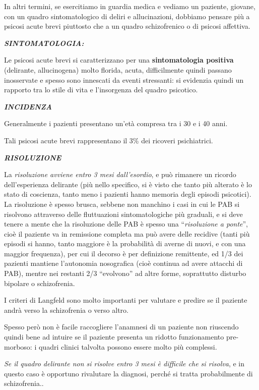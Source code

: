 \documentclass[]{article}
\begin{document}
In altri termini, se esercitiamo in guardia medica e vediamo un
paziente, giovane, con un quadro sintomatologico di deliri e
allucinazioni, dobbiamo pensare più a psicosi acute brevi piuttosto che
a un quadro schizofrenico o di psicosi affettiva.

\textbf{\emph{SINTOMATOLOGIA:}}

Le psicosi acute brevi si caratterizzano per una \textbf{sintomatologia
positiva} (delirante, allucinogena) molto florida, acuta, difficilmente
quindi passano inosservate e spesso sono innescati da eventi stressanti:
si evidenzia quindi un rapporto tra lo stile di vita e l'insorgenza del
quadro psicotico.

\textbf{\emph{INCIDENZA }}

Generalmente i pazienti presentano un'età compresa tra i 30 e i 40 anni.

Tali psicosi acute brevi rappresentano il 3\% dei ricoveri psichiatrici.

\textbf{\emph{RISOLUZIONE}}

La \emph{risoluzione avviene entro 3 mesi dall'esordio}, e può rimanere
un ricordo dell'esperienza delirante (più nello specifico, si è visto
che tanto più alterato è lo stato di coscienza, tanto meno i pazienti
hanno memoria degli episodi psicotici). La risoluzione è spesso brusca,
sebbene non manchino i casi in cui le PAB si risolvono attraverso delle
fluttuazioni sintomatologiche più graduali, e si deve tenere a mente che
la risoluzione delle PAB è spesso una ``\emph{risoluzione a ponte}'',
cioè il paziente va in remissione completa ma può avere delle recidive
(tanti più episodi si hanno, tanto maggiore è la probabilità di averne
di nuovi, e con una maggior frequenza), per cui il decorso è per
definizione remittente, ed 1/3 dei pazienti mantiene l'autonomia
nosografica (cioè continua ad avere attacchi di PAB), mentre nei
restanti 2/3 ``evolvono'' ad altre forme, soprattutto disturbo bipolare
o schizofrenia.

I criteri di Langfeld sono molto importanti per valutare e predire se il
paziente andrà verso la schizofrenia o verso altro.

Spesso però non è facile raccogliere l'anamnesi di un paziente non
riuscendo quindi bene ad intuire se il paziente presenta un ridotto
funzionamento pre-morboso: i quadri clinici talvolta possono essere
molto più complessi.

\emph{Se il quadro delirante non si risolve entro 3 mesi è difficile che
si risolva}, e in questo caso è opportuno rivalutare la diagnosi, perché
si tratta probabilmente di schizofrenia..
\end{document}
